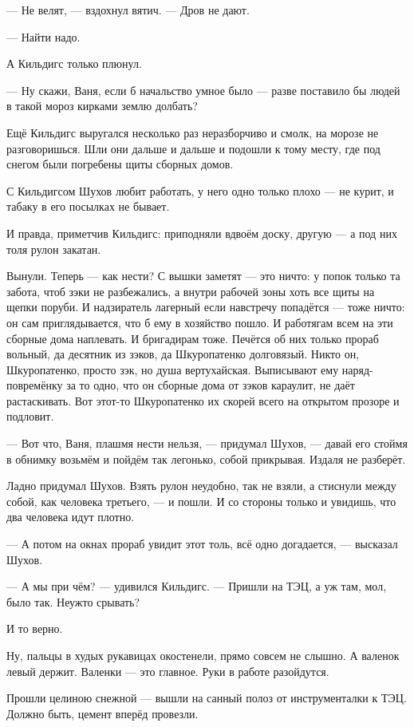 --- Не велят, --- вздохнул вятич. --- Дров не дают.

--- Найти надо.

А Кильдигс только плюнул.

--- Ну скажи, Ваня, если б начальство умное было --- разве поставило бы людей в такой мороз 
кирками землю долбать?

Ещё Кильдигс выругался несколько раз неразборчиво и смолк, на морозе не разговоришься. Шли 
они дальше и дальше и подошли к тому месту, где под снегом были погребены щиты сборных домов.

С Кильдигсом Шухов любит работать, у него одно только плохо --- не курит, и табаку в его 
посылках не бывает.

И правда, приметчив Кильдигс: приподняли вдвоём доску, другую --- а под них толя рулон закатан.

Вынули. Теперь --- как нести? С вышки заметят --- это ничто: у попок только та забота, чтоб зэки 
не разбежались, а внутри рабочей зоны хоть все щиты на щепки поруби. И надзиратель лагерный 
если навстречу попадётся --- тоже ничто: он сам приглядывается, что б ему в хозяйство пошло. И 
работягам всем на эти сборные дома наплевать. И бригадирам тоже. Печётся об них только 
прораб вольный, да десятник из зэков, да Шкуропатенко долговязый. Никто он, Шкуропатенко, 
просто зэк, но душа вертухайская. Выписывают ему наряд-повремёнку за то одно, что он сборные 
дома от зэков караулит, не даёт растаскивать. Вот этот-то Шкуропатенко их скорей всего на 
открытом прозоре и подловит.

--- Вот что, Ваня, плашмя нести нельзя, --- придумал Шухов, --- давай его стоймя в обнимку возьмём 
и пойдём так легонько, собой прикрывая. Издаля не разберёт.

Ладно придумал Шухов. Взять рулон неудобно, так не взяли, а стиснули между собой, как 
человека третьего, --- и пошли. И со стороны только и увидишь, что два человека идут плотно.

--- А потом на окнах прораб увидит этот толь, всё одно догадается, --- высказал Шухов.

--- А мы при чём? --- удивился Кильдигс. --- Пришли на ТЭЦ, а уж там, мол, было так. Неужто срывать?

И то верно.

Ну, пальцы в худых рукавицах окостенели, прямо совсем не слышно. А валенок левый держит. 
Валенки --- это главное. Руки в работе разойдутся.

Прошли целиною снежной --- вышли на санный полоз от инструменталки к ТЭЦ. Должно быть, цемент 
вперёд провезли.

